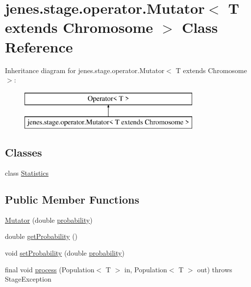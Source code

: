 \hypertarget{classjenes_1_1stage_1_1operator_1_1_mutator_3_01_t_01extends_01_chromosome_01_4}{\section{jenes.\-stage.\-operator.\-Mutator$<$ T extends Chromosome $>$ Class Reference}
\label{classjenes_1_1stage_1_1operator_1_1_mutator_3_01_t_01extends_01_chromosome_01_4}
}
Inheritance diagram for jenes.\-stage.\-operator.\-Mutator$<$ T extends Chromosome $>$\-:\begin{figure}[H]
\begin{center}
\leavevmode
\includegraphics[height=2.000000cm]{classjenes_1_1stage_1_1operator_1_1_mutator_3_01_t_01extends_01_chromosome_01_4}
\end{center}
\end{figure}
\subsection*{Classes}
\begin{DoxyCompactItemize}
\item 
class \hyperlink{classjenes_1_1stage_1_1operator_1_1_mutator_3_01_t_01extends_01_chromosome_01_4_1_1_statistics}{Statistics}
\end{DoxyCompactItemize}
\subsection*{Public Member Functions}
\begin{DoxyCompactItemize}
\item 
\hyperlink{classjenes_1_1stage_1_1operator_1_1_mutator_3_01_t_01extends_01_chromosome_01_4_a01aea5c94d65f99cca8a24be7250a06a}{Mutator} (double \hyperlink{classjenes_1_1stage_1_1operator_1_1_mutator_3_01_t_01extends_01_chromosome_01_4_a60f38eb7afd1ad6a7d1c0c639df2d5fe}{probability})
\item 
double \hyperlink{classjenes_1_1stage_1_1operator_1_1_mutator_3_01_t_01extends_01_chromosome_01_4_af8cd41f87d99e8bc5d00bf9a21ffcd86}{get\-Probability} ()
\item 
void \hyperlink{classjenes_1_1stage_1_1operator_1_1_mutator_3_01_t_01extends_01_chromosome_01_4_a49b8a34032a575badd2080d6c90397cb}{set\-Probability} (double \hyperlink{classjenes_1_1stage_1_1operator_1_1_mutator_3_01_t_01extends_01_chromosome_01_4_a60f38eb7afd1ad6a7d1c0c639df2d5fe}{probability})
\item 
final void \hyperlink{classjenes_1_1stage_1_1operator_1_1_mutator_3_01_t_01extends_01_chromosome_01_4_a091269db32219198b26860ee4b295345}{process} (Population$<$ T $>$ in, Population$<$ T $>$ out)  throws Stage\-Exception 
\end{DoxyCompactItemize}
